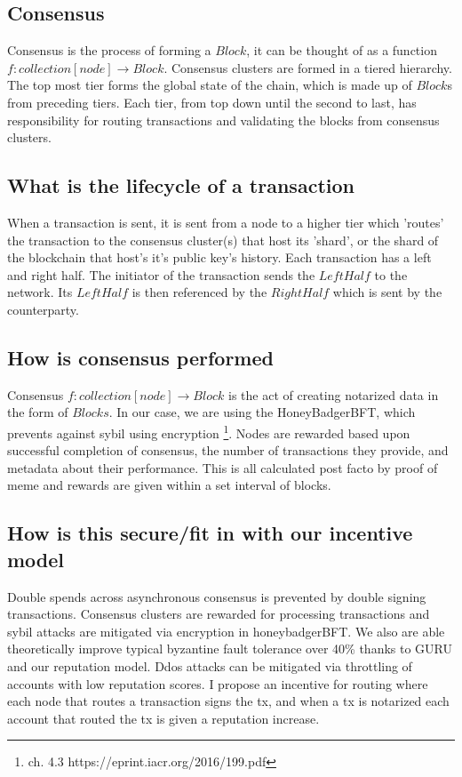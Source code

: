 \documentclass{article}
\begin{document}
\subsection{Consensus}
Consensus is the process of forming a $Block$, it can be thought of as a function $f: collection[node] \rightarrow Block$. Consensus clusters are formed in a tiered hierarchy. The top most tier forms the global state of the chain, which is made up of $Block$s from preceding tiers. Each tier, from top down until the second to last, has responsibility for routing transactions and validating the blocks from consensus clusters. 

\subsection{What is the lifecycle of a transaction}
When a transaction is sent, it is sent from a node to a higher tier which 'routes' the transaction to the consensus cluster(s) that host its 'shard', or the shard of the blockchain that host's it's public key's history. Each transaction has a left and right half. The initiator of the transaction sends the $LeftHalf$ to the network. Its $LeftHalf$ is then referenced by the $RightHalf$ which is sent by the counterparty.

\subsection{How is consensus performed}
Consensus $f: collection[node] \rightarrow  Block$ is the act of creating notarized data in the form of $Blocks$. In our case, we are using the HoneyBadgerBFT, which prevents against sybil using encryption \footnote{ch. 4.3 https://eprint.iacr.org/2016/199.pdf}. Nodes are rewarded based upon successful completion of consensus, the number of transactions they provide, and metadata about their performance. This is all calculated post facto by proof of meme and rewards are given within a set interval of blocks.

\subsection{How is this secure/fit in with our incentive model}
Double spends across asynchronous consensus is prevented by double signing transactions. Consensus clusters are rewarded for processing transactions and sybil attacks are mitigated via encryption in honeybadgerBFT. We also are able theoretically improve typical byzantine fault tolerance over 40\% thanks to GURU and our reputation model. Ddos attacks can be mitigated via throttling of accounts with low reputation scores. I propose an incentive for routing where each node that routes a transaction signs the tx, and when a tx is notarized each account that routed the tx is given a reputation increase.
\end{document}

